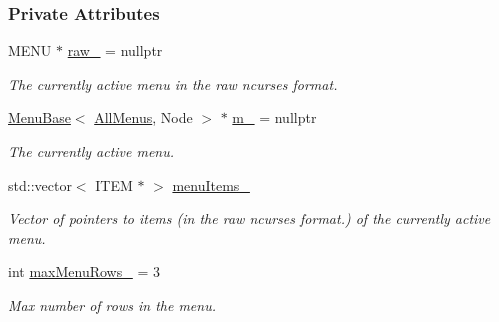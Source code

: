 \subsubsection*{Private Attributes}
\begin{DoxyCompactItemize}
\item 
M\+E\+NU $\ast$ \hyperlink{structslb_1_1core_1_1ui_1_1AllMenus_ab6c6678fe02423faf7e86ebbb6e87b14}{raw\+\_\+} = nullptr\hypertarget{structslb_1_1core_1_1ui_1_1AllMenus_ab6c6678fe02423faf7e86ebbb6e87b14}{}\label{structslb_1_1core_1_1ui_1_1AllMenus_ab6c6678fe02423faf7e86ebbb6e87b14}

\begin{DoxyCompactList}\small\item\em The currently active menu in the raw {\ttfamily ncurses} format. \end{DoxyCompactList}\item 
\hyperlink{structslb_1_1core_1_1ui_1_1MenuBase}{Menu\+Base}$<$ \hyperlink{structslb_1_1core_1_1ui_1_1AllMenus}{All\+Menus}, Node $>$ $\ast$ \hyperlink{structslb_1_1core_1_1ui_1_1AllMenus_afa812ad21990179b69a1a74639fcebb6}{m\+\_\+} = nullptr\hypertarget{structslb_1_1core_1_1ui_1_1AllMenus_afa812ad21990179b69a1a74639fcebb6}{}\label{structslb_1_1core_1_1ui_1_1AllMenus_afa812ad21990179b69a1a74639fcebb6}

\begin{DoxyCompactList}\small\item\em The currently active menu. \end{DoxyCompactList}\item 
std\+::vector$<$ I\+T\+EM $\ast$ $>$ \hyperlink{structslb_1_1core_1_1ui_1_1AllMenus_ac85fb1060b5356bb5a56e6cfe6d3575c}{menu\+Items\+\_\+}\hypertarget{structslb_1_1core_1_1ui_1_1AllMenus_ac85fb1060b5356bb5a56e6cfe6d3575c}{}\label{structslb_1_1core_1_1ui_1_1AllMenus_ac85fb1060b5356bb5a56e6cfe6d3575c}

\begin{DoxyCompactList}\small\item\em Vector of pointers to items (in the raw {\ttfamily ncurses} format.) of the currently active menu. \end{DoxyCompactList}\item 
int \hyperlink{structslb_1_1core_1_1ui_1_1AllMenus_aad8ba60881528bf0fcea0ac85696e0ca}{max\+Menu\+Rows\+\_\+} = 3\hypertarget{structslb_1_1core_1_1ui_1_1AllMenus_aad8ba60881528bf0fcea0ac85696e0ca}{}\label{structslb_1_1core_1_1ui_1_1AllMenus_aad8ba60881528bf0fcea0ac85696e0ca}

\begin{DoxyCompactList}\small\item\em Max number of rows in the menu. \end{DoxyCompactList}\end{DoxyCompactItemize}


